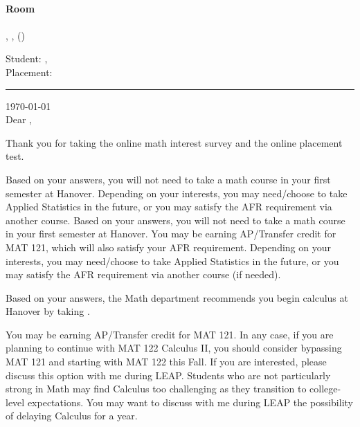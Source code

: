 \documentclass[12pt]{article}
\begin{document}
	\newpage
	{\ }
		\vfill
	\begin{center}
	{\Huge
	\textbf{Room\\
	\vspace{0.5in}
	}
	}\\
	\vfill
		, ,   ()\\
	\end{center}
	\vfill
		\newpage
		{\Large Student: , \\
		Placement: 
		}
		\vspace{0.2in}
		\hrule
		\vspace{0.6in}
		\noindent\today\\

		\vspace{0.2in}
		\noindent Dear ,
		\vspace{0.2in}

		Thank you for taking the online math interest survey and the online placement test.

		    Based on your answers, you will not need to take a math course in your first semester at Hanover. Depending on your interests, you may need/choose to take Applied Statistics in the future, or you may satisfy the AFR requirement via another course. 
		    Based on your answers, you will not need to take a math course in your first semester at Hanover. You may be earning AP/Transfer credit for MAT 121, which will also satisfy your AFR requirement. Depending on your interests, you may need/choose to take Applied Statistics in the future, or you may satisfy the AFR requirement via another course (if needed).
	  
	  
      Based on your answers, the Math department recommends you begin calculus at Hanover by taking .


      You may be earning AP/Transfer credit for MAT 121. In any case, if you are planning to continue with MAT 122 Calculus II, you should consider bypassing MAT 121 and starting with MAT 122 this Fall. If you are interested, please discuss this option with me during LEAP.
      		Students who are not particularly strong in Math may find Calculus too challenging as they transition to college-level expectations. You may want to discuss with me during LEAP the possibility of delaying Calculus for a year.
\end{document}
